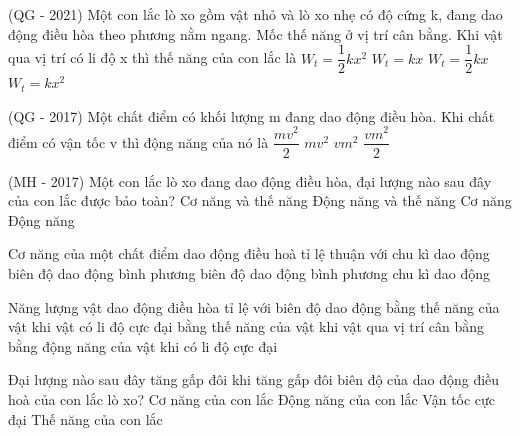 \begin{ex}
(QG - 2021) Một con lắc lò xo gồm vật nhỏ và lò xo nhẹ có độ cứng k, đang dao động điều hòa theo phương nằm ngang. Mốc thế năng ở vị trí cân bằng. Khi vật qua vị trí có li độ x thì thế năng của con lắc là
\choice
{\True $W_t=\dfrac{1}{2}kx^2$}
{$W_t=kx$}
{$W_t=\dfrac{1}{2}kx$}
{$W_t=kx^2$}
\end{ex} 
\begin{ex} %
(QG - 2017) Một chất điểm có khối lượng m đang dao động điều hòa. Khi chất điểm có vận tốc v thì động năng của nó là
\choice
{\True $\dfrac{m{v}^{2}}{2}$}
{$mv^{2}$}
{$vm^{2}$}
{$\dfrac{v{m}^{2}}{2}$}
\end{ex} 
\begin{ex} %
(MH - 2017) Một con lắc lò xo đang dao động điều hòa, đại lượng nào sau đây của con lắc được bảo toàn?
\choice
{Cơ năng và thế năng}
{Động năng và thế năng}
{\True Cơ năng}
{Động năng}
\end{ex} 
\begin{ex}
Cơ năng của một chất điểm dao động điều hoà tỉ lệ thuận với
\choice
{chu kì dao động}
{biên độ dao động}
{\True bình phương biên độ dao động}
{bình phương chu kì dao động}
\end{ex} 
\begin{ex} %
Năng lượng vật dao động điều hòa
\choice
{tỉ lệ với biên độ dao động}
{\True bằng thế năng của vật khi vật có li độ cực đại}
{bằng thế năng của vật khi vật qua vị trí cân bằng}
{bằng động năng của vật khi có li độ cực đại}
\end{ex} 


\begin{ex}
Đại lượng nào sau đây tăng gấp đôi khi tăng gấp đôi biên độ của dao động điều hoà của con lắc lò xo?
\choice
{Cơ năng của con lắc}
{Động năng của con lắc}
{\True Vận tốc cực đại}
{Thế năng của con lắc}
\end{ex} 


